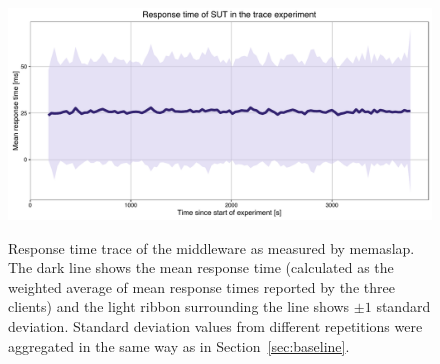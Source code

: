 \documentclass[11pt]{article}
\begin{document}
\begin{figure}[p]
\centering
\includegraphics[width=\textwidth]{../results/trace_rep3/graphs/responsetime.pdf}
\label{fig:rep3:responsetime}
\caption{Response time trace of the middleware as measured by memaslap. The dark line shows the mean response time (calculated as the weighted average of mean response times reported by the three clients) and the light ribbon surrounding the line shows $\pm 1$ standard deviation. Standard deviation values from different repetitions were aggregated in the same way as in Section~\ref{sec:baseline}.}
\end{figure}
\end{document}
